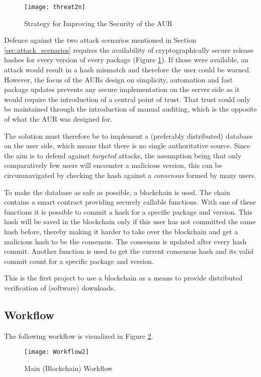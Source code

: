 \label{sec:AURsec}
\begin{figure}
	\centering
	\texttt{[image: threat2n]}
	\caption[Threat Prevention Strategy]{Strategy for Improving the Security of the AUR}
	\label{fig:threat2}
\end{figure}

Defence against the two attack scenarios mentioned in Section \ref{sec:attack_scenarios} requires the availability of cryptographically secure release hashes for every version of every package (Figure \ref{fig:threat2}).
If those were available, an attack would result in a hash mismatch and therefore the user could be warned.
However, the focus of the AURs design on simplicity, automation and fast package updates prevents any secure implementation on the server side as it would require the introduction of a central point of trust. That trust could only be maintained through the introduction of manual auditing, which is the opposite of what the AUR was designed for.

The solution must therefore be to implement a (preferably distributed) database on the user side, which means that there is no single authoritative source.
Since the aim is to defend against \emph{targeted} attacks, the assumption being that only comparatively few users will encounter a malicious version, this can be circumnavigated by checking the hash against a \emph{consensus} formed by many users.

To make the database as safe as possible, a blockchain is used. The chain contains a smart contract providing securely callable functions. With one of these functions it is possible to commit a hash for a specific package and version.
This hash will be saved in the blockchain only if this user has not committed the same hash before, thereby making it harder to take over the blockchain and get a malicious hash to be the consensus.
The consensus is updated after every hash commit. Another function is used to get the current consensus hash and its valid commit count for a specific package and version.

This is the first project to use a blockchain as a means to provide distributed verification of (software) downloads.

\subsection{Workflow}
\label{sec:workflow}
The following workflow is visualized in Figure \ref{fig:main_workflow}.
\begin{figure}[!htb]
	\centering
		\texttt{[image: Workflow2]}
	\caption{Main (Blockchain) Workflow}
	\label{fig:main_workflow}
\end{figure}

